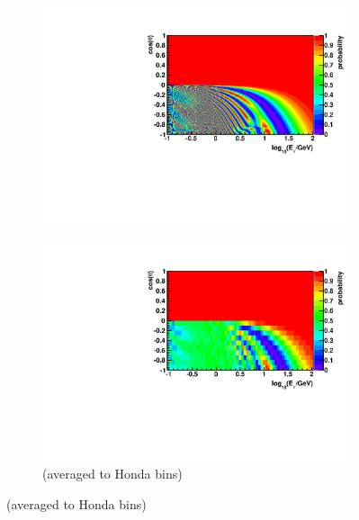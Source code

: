 \documentclass{beamer}
\begin{document}
\begin{frame}
\begin{figure}
\begin{subfigure}[]{0.45\linewidth}
			\centering
			\vspace{-15pt}
			\caption{ $\nu_{\mu} \rightarrow \nu_{\mu}$ }
			\vspace{-8pt}
			\includegraphics[width=\linewidth]{atm_numu2numu.pdf} \\
			\vspace{-10pt}
			\caption*{(averaged to Honda bins)}
			\vspace{-8pt}
			\includegraphics[width=\linewidth]{atm_numu2numu_avg.pdf}
		\end{subfigure}
	\end{figure}
\end{frame}
\end{document}
